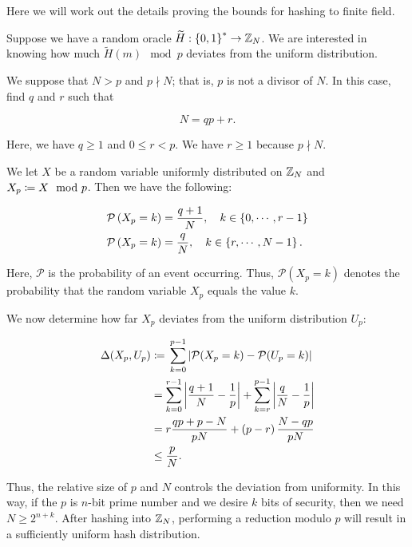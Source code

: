 Here we will work out the details proving the bounds for hashing
to \gls{finite field}.

Suppose we have a \gls{random oracle} $\widetilde{H}:\left\{ 0,1 \right\}^{*}\to\mathbb{Z}_{N}$.
We are interested in knowing how much $\widetilde{H}(m) \mod p$
deviates from the uniform distribution.

We suppose that $N>p$ and $p\nmid N$;
that is, $p$ is not a divisor of $N$.
In this case, find $q$ and $r$ such that

\begin{equation}
    N = qp + r.
\end{equation}

\noindent
Here, we have $q\ge1$ and $0\le r < p$.
We have $r\ge1$ because $p\nmid N$.

We let $X$ be a random variable uniformly distributed on $\mathbb{Z}_{N}$
and $X_{p} \coloneqq{} X \mod p$.
Then we have the following:

\begin{align}
    \mathcal{P}\left( X_{p} = k \right) &= \frac{q+1}{N},
        \quad k\in \left\{ 0,\cdots,r-1 \right\} \nonumber\\
    \mathcal{P}\left( X_{p} = k \right) &= \frac{q}{N},
        \quad k \in \left\{ r,\cdots,N-1 \right\}.
\end{align}

\noindent
Here, $\mathcal{P}$ is the probability of an event occurring.
Thus, $\mathcal{P}(X_{p} = k)$ denotes the probability
that the random variable $X_{p}$ equals the value $k$.

We now determine how far $X_{p}$ deviates from the uniform
distribution $U_{p}$:

\begin{align}
    \Delta(X_{p},U_{p}) &\coloneqq{}
    \sum_{k=0}^{p-1} \left| \mathcal{P}(X_{p}=k) - \mathcal{P}(U_{p}=k) \right|
        \nonumber\\
    &= \sum_{k=0}^{r-1} \left| \frac{q+1}{N} - \frac{1}{p} \right| +
        \sum_{k=r}^{p-1} \left| \frac{q}{N} - \frac{1}{p} \right| \nonumber\\
    &= r\frac{qp + p - N}{pN} + \left( p-r \right)\frac{N-qp}{pN}
        \nonumber\\
    &\le \frac{p}{N}.
\end{align}

\noindent
Thus, the relative size of $p$ and $N$ controls the deviation from uniformity.
In this way, if the $p$ is $n$-bit prime number and we desire
$k$ bits of security,
then we need $N\ge 2^{n+k}$.
After hashing into $\mathbb{Z}_{N}$, performing a reduction modulo $p$
will result in a sufficiently uniform hash distribution.

